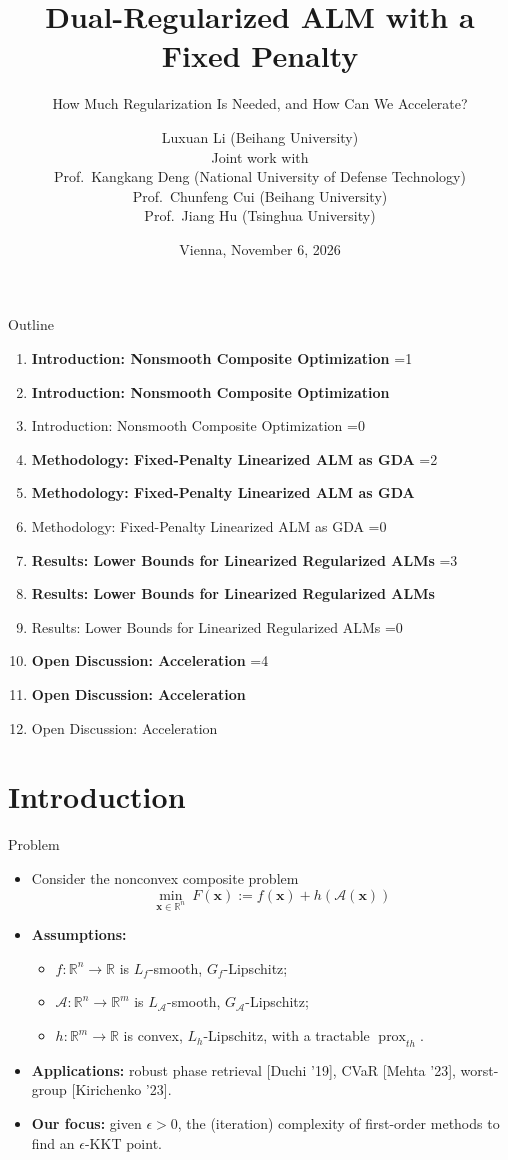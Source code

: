 \documentclass[10pt]{beamer}
\title{Dual-Regularized ALM with a Fixed Penalty}
\subtitle{How Much Regularization Is Needed, and How Can We Accelerate?}
\author{Luxuan Li (Beihang University)\\[6pt]
{\small Joint work with}\\[1pt]
{\footnotesize Prof.\ Kangkang Deng (National University of Defense Technology)}\\
{\footnotesize Prof.\ Chunfeng Cui (Beihang University)}\\
{\footnotesize Prof.\ Jiang Hu (Tsinghua University)}}
\date{Vienna, November 6, 2026}
\newcommand{\outlineitem}[3]{%
  \ifnum\value{section}=0\relax\item[\textbf{#2.}]\textbf{#3}%
  \else\ifnum\value{section}=#1\relax\item[\textbf{#2.}]\textbf{#3}%
  \else\item[{\color{outlinegray}\textbf{#2.}}]{\color{outlinegray}#3}\fi\fi}
\newcommand{\outlinelist}{%
\begin{enumerate}\setlength{\itemsep}{10pt}
    \outlineitem{1}{I}{Introduction: Nonsmooth Composite Optimization}
    \outlineitem{2}{II}{Methodology: Fixed-Penalty Linearized ALM as GDA}
    \outlineitem{3}{III}{Results: Lower Bounds for Linearized Regularized ALMs}
    \outlineitem{4}{IV}{Open Discussion: Acceleration}
\end{enumerate}}
\newcommand{\citeb}[1]{{\color{gray!75!black}\footnotesize[#1]}}
\newcommand{\RR}{\mathbb{R}}
\newcommand{\bx}{\mathbf{x}}
\newcommand{\calA}{\mathcal{A}}
\newcommand{\prox}{\operatorname{prox}}
\begin{document}
\begin{frame}
\titlepage
\end{frame}

\begin{frame}{Outline}
\vspace{0.6cm}
\outlinelist
\end{frame}

\section{Introduction}

\begin{frame}{Problem}
\small
\begin{itemize}\setlength{\itemsep}{4pt}
    \item Consider the nonconvex composite problem
    \[
        \min_{\bx\in\RR^n}\ F(\bx):=f(\bx)+h(\calA(\bx))
        \tag{P}
    \]
    \item \textbf{Assumptions:}
    \begin{itemize}\setlength{\itemsep}{0pt}
        \item $f:\RR^n\to\RR$ is $L_f$-smooth, $G_f$-Lipschitz;
        \item $\calA:\RR^n\to\RR^m$ is $L_{\calA}$-smooth, $G_{\calA}$-Lipschitz;
        \item $h:\RR^m\to\RR$ is convex, $L_h$-Lipschitz, with a tractable $\prox_{th}$.
    \end{itemize}
    \item \textbf{Applications:} robust phase retrieval \citeb{Duchi '19}, CVaR \citeb{Mehta '23}, worst-group \citeb{Kirichenko '23}.
    \item \textbf{Our focus:} given $\epsilon>0$, the (iteration) complexity of first-order methods to find an $\epsilon$-KKT point.
\end{itemize}
\end{frame}
\end{document}
